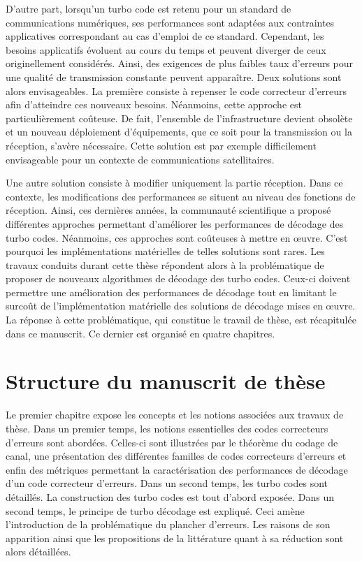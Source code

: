 D'autre part, lorsqu'un turbo code est retenu pour un standard de communications numériques, ses performances sont adaptées aux
contraintes applicatives correspondant au cas d'emploi de ce standard. Cependant, les besoins applicatifs évoluent au cours du temps et peuvent diverger de ceux originellement considérés. Ainsi, des exigences de plus faibles taux 
d'erreurs pour une qualité de transmission constante peuvent apparaître. Deux solutions sont alors envisageables. La première
consiste à repenser le code correcteur d'erreurs afin d'atteindre ces nouveaux besoins. Néanmoins, cette approche est 
particulièrement coûteuse. De fait, l'ensemble de l’infrastructure devient obsolète et un nouveau déploiement 
d'équipements, que ce soit pour la transmission ou la réception, s'avère nécessaire. Cette solution est par exemple 
difficilement envisageable pour un contexte de communications satellitaires.

Une autre solution consiste à modifier uniquement la partie réception. Dans ce contexte, les modifications des performances 
se situent au niveau des fonctions de réception. Ainsi, ces dernières années, la communauté scientifique a proposé différentes 
approches permettant d'améliorer les performances de décodage des turbo codes. Néanmoins, ces approches sont coûteuses
à mettre en œuvre. C'est pourquoi les implémentations matérielles de telles solutions sont rares. Les travaux conduits 
durant cette thèse répondent alors à la problématique de proposer de nouveaux algorithmes de décodage des
turbo codes. Ceux-ci doivent permettre une amélioration des performances de décodage tout en limitant le surcoût de l'implémentation matérielle 
des solutions de décodage mises en œuvre.
 La réponse à cette problématique, qui constitue le travail de thèse, est récapitulée dans ce manuscrit. Ce dernier est organisé 
 en quatre chapitres.

\section*{Structure du manuscrit de thèse}
Le premier chapitre expose les concepts et les notions associées aux travaux de thèse. Dans un premier temps, les notions 
essentielles des codes correcteurs d'erreurs sont abordées. Celles-ci sont illustrées par le théorème du codage de 
canal, une présentation des différentes familles de codes correcteurs d'erreurs et enfin des métriques permettant la 
caractérisation des performances de décodage d'un code correcteur d'erreurs. Dans un second temps, les turbo codes sont détaillés.
La construction des turbo codes est tout d'abord exposée. Dans un second temps, le principe de turbo décodage est expliqué. Ceci amène 
l'introduction de la problématique du plancher d'erreurs. Les raisons de son 
apparition ainsi que les propositions de la littérature quant à sa réduction sont alors détaillées.

